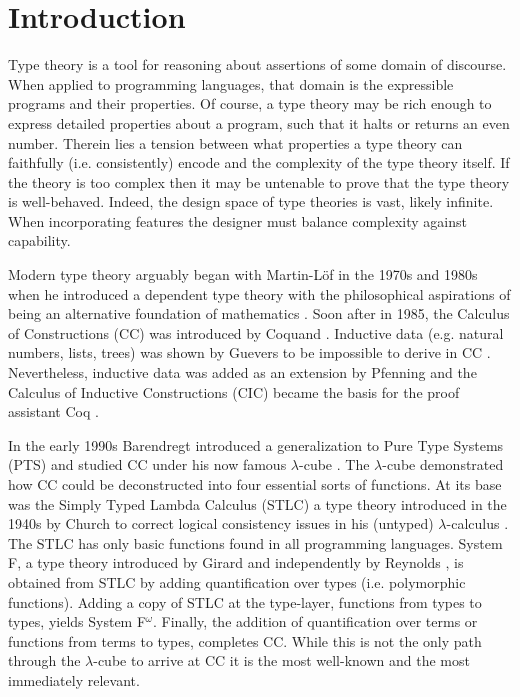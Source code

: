 \chapter{Introduction}



Type theory is a tool for reasoning about assertions of some domain of discourse.
When applied to programming languages, that domain is the expressible programs and their properties.
Of course, a type theory may be rich enough to express detailed properties about a program, such that it halts or returns an even number.
Therein lies a tension between what properties a type theory can faithfully (i.e. consistently) encode and the complexity of the type theory itself.
If the theory is too complex then it may be untenable to prove that the type theory is well-behaved.
Indeed, the design space of type theories is vast, likely infinite.
When incorporating features the designer must balance complexity against capability.

Modern type theory arguably began with Martin-L\"{o}f in the 1970s and 1980s when he introduced a dependent type theory with the philosophical aspirations of being an alternative foundation of mathematics \cite{lof1975,lof1984}.
Soon after in 1985, the Calculus of Constructions (CC) was introduced by Coquand \cite{coquand1985,coquand1986}.
Inductive data (e.g. natural numbers, lists, trees) was shown by Guevers to be impossible to derive in CC \cite{geuvers2001_noind}.
Nevertheless, inductive data was added as an extension by Pfenning \cite{pfenning1989} and the Calculus of Inductive Constructions (CIC) became the basis for the proof assistant Coq \cite{paulin-mohring1993}.

In the early 1990s Barendregt introduced a generalization to Pure Type Systems (PTS) and studied CC under his now famous $\lambda$-cube \cite{barendregt1990_cube,barendregt1991_pts}.
The $\lambda$-cube demonstrated how CC could be deconstructed into four essential sorts of functions.
At its base was the Simply Typed Lambda Calculus (STLC) a type theory introduced in the 1940s by Church to correct logical consistency issues in his (untyped) $\lambda$-calculus \cite{church1940_stlc}.
The STLC has only basic functions found in all programming languages.
System F, a type theory introduced by Girard \cite{girard1972,girard1989} and independently by Reynolds \cite{reynolds1974_systemf}, is obtained from STLC by adding quantification over types (i.e. polymorphic functions).
Adding a copy of STLC at the type-layer, functions from types to types, yields System F$^\omega$.
Finally, the addition of quantification over terms or functions from terms to types, completes CC.
While this is not the only path through the $\lambda$-cube to arrive at CC it is the most well-known and the most immediately relevant.


